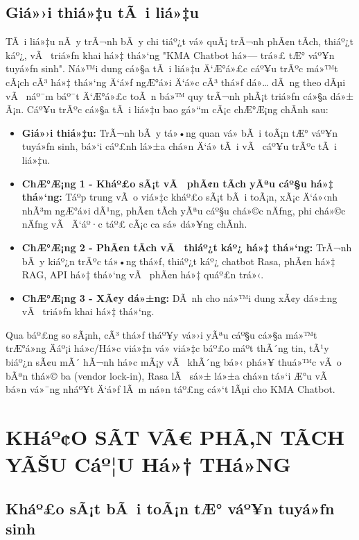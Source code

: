﻿\documentclass[12pt,a4paper]{report}
\begin{document}
\section{Giá»›i thiá»‡u tÃ i liá»‡u}
\label{sec:document_introduction}
TÃ i liá»‡u nÃ y trÃ¬nh bÃ y chi tiáº¿t vá» quÃ¡ trÃ¬nh phÃ¢n tÃ­ch, thiáº¿t káº¿, vÃ  triá»ƒn khai há»‡ thá»‘ng "KMA Chatbot há»— trá»£ tÆ° váº¥n tuyá»ƒn sinh". Ná»™i dung cá»§a tÃ i liá»‡u Ä‘Æ°á»£c cáº¥u trÃºc má»™t cÃ¡ch cÃ³ há»‡ thá»‘ng Ä‘á»ƒ ngÆ°á»i Ä‘á»c cÃ³ thá»ƒ dá»… dÃ ng theo dÃµi vÃ  náº¯m báº¯t Ä‘Æ°á»£c toÃ n bá»™ quy trÃ¬nh phÃ¡t triá»ƒn cá»§a dá»± Ã¡n. Cáº¥u trÃºc cá»§a tÃ i liá»‡u bao gá»“m cÃ¡c chÆ°Æ¡ng chÃ­nh sau:
\begin{itemize}
    \item \textbf{Giá»›i thiá»‡u:} TrÃ¬nh bÃ y tá»•ng quan vá» bÃ i toÃ¡n tÆ° váº¥n tuyá»ƒn sinh, bá»‘i cáº£nh lá»±a chá»n Ä‘á» tÃ i vÃ  cáº¥u trÃºc tÃ i liá»‡u.
    \item \textbf{ChÆ°Æ¡ng 1 - Kháº£o sÃ¡t vÃ  phÃ¢n tÃ­ch yÃªu cáº§u há»‡ thá»‘ng:} Táº­p trung vÃ o viá»‡c kháº£o sÃ¡t bÃ i toÃ¡n, xÃ¡c Ä‘á»‹nh nhÃ³m ngÆ°á»i dÃ¹ng, phÃ¢n tÃ­ch yÃªu cáº§u chá»©c nÄƒng, phi chá»©c nÄƒng vÃ  Ä‘áº·c táº£ cÃ¡c ca sá»­ dá»¥ng chÃ­nh.
    \item \textbf{ChÆ°Æ¡ng 2 - PhÃ¢n tÃ­ch vÃ  thiáº¿t káº¿ há»‡ thá»‘ng:} TrÃ¬nh bÃ y kiáº¿n trÃºc tá»•ng thá»ƒ, thiáº¿t káº¿ chatbot Rasa, phÃ¢n há»‡ RAG, API há»‡ thá»‘ng vÃ  phÃ¢n há»‡ quáº£n trá»‹.
    \item \textbf{ChÆ°Æ¡ng 3 - XÃ¢y dá»±ng:} DÃ nh cho ná»™i dung xÃ¢y dá»±ng vÃ  triá»ƒn khai há»‡ thá»‘ng.
\end{itemize}


Qua báº£ng so sÃ¡nh, cÃ³ thá»ƒ tháº¥y vá»›i yÃªu cáº§u cá»§a má»™t trÆ°á»ng Äáº¡i há»c/Há»c viá»‡n vá» viá»‡c báº£o máº­t thÃ´ng tin, tÃ¹y biáº¿n sÃ¢u mÃ´ hÃ¬nh há»c mÃ¡y vÃ  khÃ´ng bá»‹ phá»¥ thuá»™c vÃ o bÃªn thá»© ba (vendor lock-in), Rasa lÃ  sá»± lá»±a chá»n tá»‘i Æ°u vÃ  bá»n vá»¯ng nháº¥t Ä‘á»ƒ lÃ m ná»n táº£ng cá»‘t lÃµi cho KMA Chatbot.


\endgroup


\chapter{KHáº¢O SÃT VÃ€ PHÃ‚N TÃCH YÃŠU Cáº¦U Há»† THá»NG}


\section{Kháº£o sÃ¡t bÃ i toÃ¡n tÆ° váº¥n tuyá»ƒn sinh}
\end{document}
